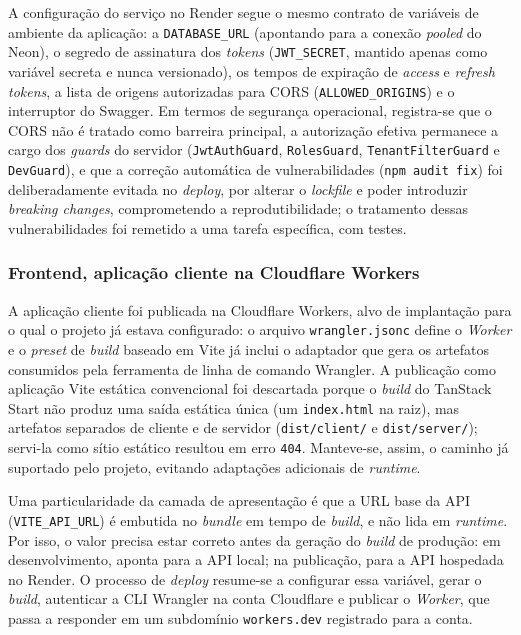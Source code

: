 A configuração do serviço no Render segue o mesmo contrato de variáveis de ambiente da aplicação: a \texttt{DATABASE\_URL} (apontando para a conexão \textit{pooled} do Neon), o segredo de assinatura dos \textit{tokens} (\texttt{JWT\_SECRET}, mantido apenas como variável secreta e nunca versionado), os tempos de expiração de \textit{access} e \textit{refresh tokens}, a lista de origens autorizadas para CORS (\texttt{ALLOWED\_ORIGINS}) e o interruptor do Swagger. Em termos de segurança operacional, registra-se que o CORS não é tratado como barreira principal, a autorização efetiva permanece a cargo dos \textit{guards} do servidor (\texttt{JwtAuthGuard}, \texttt{RolesGuard}, \texttt{TenantFilterGuard} e \texttt{DevGuard}), e que a correção automática de vulnerabilidades (\texttt{npm audit fix}) foi deliberadamente evitada no \textit{deploy}, por alterar o \textit{lockfile} e poder introduzir \textit{breaking changes}, comprometendo a reprodutibilidade; o tratamento dessas vulnerabilidades foi remetido a uma tarefa específica, com testes.

\subsubsection{Frontend, aplicação cliente na Cloudflare Workers}

A aplicação cliente foi publicada na Cloudflare Workers, alvo de implantação para o qual o projeto já estava configurado: o arquivo \texttt{wrangler.jsonc} define o \textit{Worker} e o \textit{preset} de \textit{build} baseado em Vite já inclui o adaptador que gera os artefatos consumidos pela ferramenta de linha de comando Wrangler. A publicação como aplicação Vite estática convencional foi descartada porque o \textit{build} do TanStack Start não produz uma saída estática única (um \texttt{index.html} na raiz), mas artefatos separados de cliente e de servidor (\texttt{dist/client/} e \texttt{dist/server/}); servi-la como sítio estático resultou em erro \texttt{404}. Manteve-se, assim, o caminho já suportado pelo projeto, evitando adaptações adicionais de \textit{runtime}.

Uma particularidade da camada de apresentação é que a URL base da API (\texttt{VITE\_API\_URL}) é embutida no \textit{bundle} em tempo de \textit{build}, e não lida em \textit{runtime}. Por isso, o valor precisa estar correto antes da geração do \textit{build} de produção: em desenvolvimento, aponta para a API local; na publicação, para a API hospedada no Render. O processo de \textit{deploy} resume-se a configurar essa variável, gerar o \textit{build}, autenticar a CLI Wrangler na conta Cloudflare e publicar o \textit{Worker}, que passa a responder em um subdomínio \texttt{workers.dev} registrado para a conta.

